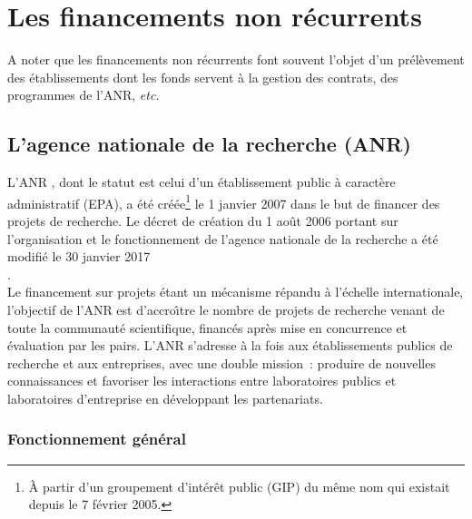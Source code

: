 

\chapter{Les financements non r\'ecurrents}
\label{financement-projets}



A noter que les financements non r\'ecurrents font souvent l'objet d'un
pr\'el\`evement des {\'e}tablissements dont les fonds servent \`a la gestion des contrats,
des programmes de l'ANR, {\em etc.}


\section{L'agence nationale de la recherche (ANR)}

L'ANR , dont le statut est celui
d'un \'etablissement public \`a caract\`ere administratif (EPA),
a \'et\'e cr\'e\'ee\footnote{\`A partir d'un groupement d'int\'er\^et public (GIP) du m\^eme nom
qui existait depuis le 7 f\'evrier 2005.} le 1\ier{} janvier 2007
dans le but de financer des projets de recherche. Le d\'ecret de cr\'eation du
1\ier{} ao\^ut 2006 portant sur l'organisation et le fonctionnement
de l'agence nationale de la recherche a \'et\'e modifi\'e le 30 janvier 2017 
\\.\\

Le financement sur projets \'etant un m\'ecanisme
r\'epandu \`a l'\'echelle internationale,
l'objectif de l'ANR est d'accro\^\i  tre le nombre de projets de
recherche venant de toute la communaut\'e scientifique, financ\'es
apr\`es mise en concurrence et \'evaluation par les pairs.
L'ANR s'adresse \`a la fois aux \'etablissements publics de recherche
et aux entreprises, avec une double mission~: produire de nouvelles
connaissances et favoriser les interactions entre laboratoires
publics et laboratoires d'entreprise en d\'eveloppant les
partenariats.


\subsection{Fonctionnement g\'en\'eral}

